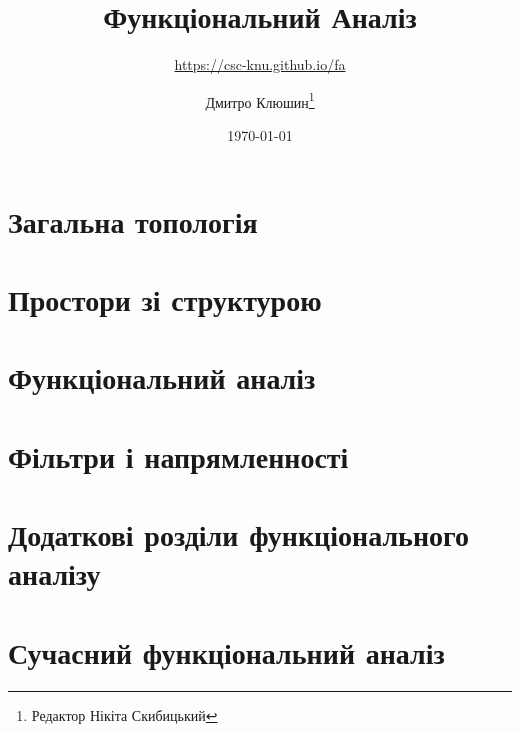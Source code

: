 \documentclass[a4paper,11pt,twoside=semi,openright,numbers=noenddot]{scrbook}
\title{Функціональний Аналіз}
\subtitle{\url{https://csc-knu.github.io/fa}}
\author{Дмитро Клюшин\thanks{Редактор Нікіта Скибицький}}
\date{\today}
\begin{document}
\frontmatter

\maketitle

\thispagestyle{empty}





\tableofcontents

\mainmatter

\part{Загальна топологія}
\parttoc






\part{Простори зі структурою}
\parttoc






\part{Функціональний аналіз}
\parttoc








\part{Фільтри і напрямленності}
\parttoc






\part{Додаткові розділи функціонального аналізу}
\parttoc





\part{Сучасний функціональний аналіз}
\parttoc







\end{document}
